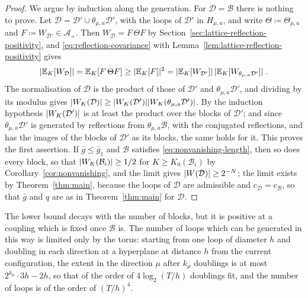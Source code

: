 \documentclass[11pt]{preprint}
\DeclarePairedDelimiter{\abs}{\lvert}{\rvert}
\numberwithin{equation}{section}
\theoremstyle{definition}
\theoremstyle{remark}
\theoremstyle{plain}
\begin{document}
\begin{proof}
We argue by induction along the generation. For $\mathcal D = \mathcal B$ there is nothing to prove. Let $\mathcal D = \mathcal D' \cup \theta_{\mu,a}\mathcal D'$, with the loops of $\mathcal D'$ in $H_{\mu,a}$, and write $\Theta \coloneqq \Theta_{\mu,a}$ and $F \coloneqq W_{\mathcal D'} \in \mathcal A_+$. Then $W_{\mathcal D} = F\,\Theta F$ by Section~\ref{sec:lattice-reflection-positivity}, and \eqref{eq:reflection-covariance} with Lemma~\ref{lem:lattice-reflection-positivity} gives
\begin{equation}\label{eq:doubling-inequality}
    \abs{\mathbb E_K[W_{\mathcal D}]} = \mathbb E_K[F\,\Theta F] \geq \abs{\mathbb E_K[F]}^2 = \abs{\mathbb E_K[W_{\mathcal D'}]}\,\abs{\mathbb E_K[W_{\theta_{\mu,a}\mathcal D'}]}\;.
\end{equation}
The normalisation of $\mathcal D$ is the product of those of $\mathcal D'$ and $\theta_{\mu,a}\mathcal D'$, and dividing by its modulus gives $\abs{W_K(\mathcal D)} \geq \abs{W_K(\mathcal D')}\abs{W_K(\theta_{\mu,a}\mathcal D')}$. By the induction hypothesis $\abs{W_K(\mathcal D')}$ is at least the product over the blocks of $\mathcal D'$; and since $\theta_{\mu,a}\mathcal D'$ is generated by reflections from $\theta_{\mu,a}\mathcal B$, with the conjugated reflections, and has the images of the blocks of $\mathcal D'$ as its blocks, the same holds for it. This proves the first assertion. If $\bar g \leq \bar g_1$ and $\mathcal B$ satisfies \eqref{eq:nonvanishing-length}, then so does every block, so that $\abs{W_K(\mathcal B_i)} \geq 1/2$ for $K \geq K_0(\mathcal B_i)$ by Corollary~\ref{cor:nonvanishing}, and the limit gives $\abs{W(\mathcal D)} \geq 2^{-N}$; the limit exists by Theorem~\ref{thm:main}, because the loops of $\mathcal D$ are admissible and $c_{\mathcal D} = c_{\mathcal B}$, so that $\bar g$ and $q$ are as in Theorem~\ref{thm:main} for $\mathcal D$.
\end{proof}

The lower bound decays with the number of blocks, but it is positive at a coupling which is fixed once $\mathcal B$ is. The number of loops which can be generated in this way is limited only by the torus: starting from one loop of diameter $h$ and doubling in each direction at a hyperplane at distance $h$ from the current configuration, the extent in the direction $\mu$ after $k_\mu$ doublings is at most $2^{k_\mu}\cdot3h - 2h$, so that of the order of $4\log_2(T/h)$ doublings fit, and the number of loops is of the order of $(T/h)^4$.
\end{document}
